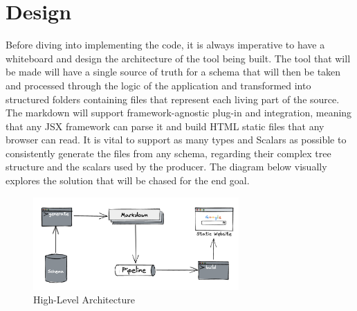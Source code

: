 \section{Design}
\label{s:ch5-Design}
Before diving into implementing the code, it is always imperative to have a
whiteboard and design the architecture of the tool being built. The tool that
will be made will have a single source of truth for a schema that will then be
taken and processed through the logic of the application and transformed into
structured folders containing files that represent each living part of the
source. The markdown will support framework-agnostic plug-in and integration,
meaning that any JSX framework can parse it and build HTML static files that any
browser can read. It is vital to support as many types and Scalars as possible
to consistently generate the files from any schema, regarding their complex tree
structure and the scalars used by the producer. The diagram below visually
explores the solution that will be chased for the end goal.

\begin{figure}[H]
  \centering
  \includegraphics[width=0.7\textwidth]{figures/architecture}
  \caption{High-Level Architecture}
  \label{f:ch5-architecture}
\end{figure}

